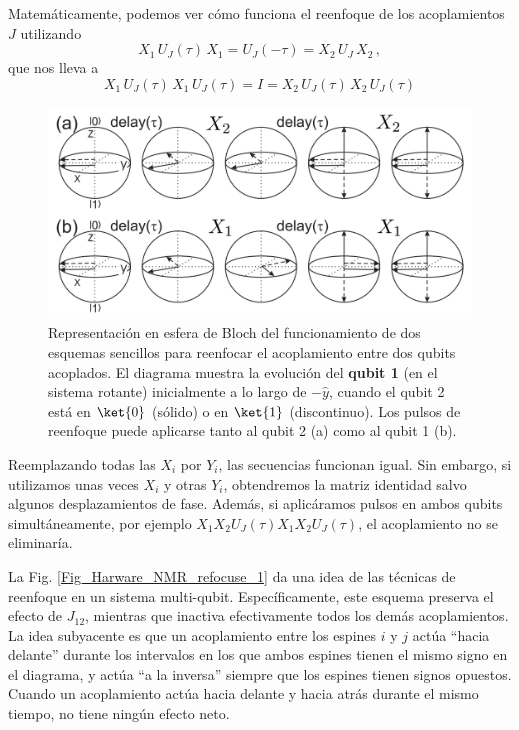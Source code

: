 Matemáticamente, podemos ver cómo funciona el reenfoque de los acoplamientos $J$ utilizando 
	\begin{equation}
	X_1 \, U_J(\tau) \, X_1 = U_J (- \tau) = X_2 \, U_J \, X_2 \, ,
	\end{equation}
que nos lleva a 
	\begin{equation}
	 X_1 \, U_J(\tau) \, X_1 \, U_J(\tau) = I =  X_2 \, U_J(\tau) \, X_2 \, U_J(\tau)
	\end{equation}




	\begin{figure}[t]
	\centering 
	\includegraphics[width=0.7\linewidth]{Figuras/Fig_Harware_NMR_refocusing.png}
	\caption{Representación en esfera de Bloch del funcionamiento de dos esquemas sencillos para reenfocar el acoplamiento entre dos qubits acoplados. El diagrama muestra la evolución del \textbf{qubit 1} (en el sistema rotante) inicialmente a lo largo de $- \hat{y}$, cuando el qubit 2 está en $\ket{0}$ (sólido) o en $\ket{1}$ (discontinuo). Los pulsos de reenfoque puede aplicarse tanto al  qubit 2 (a) como al qubit 1 (b).}
	\label{Fig_Harware_NMR_refocusing}
	\end{figure}


Reemplazando todas las $X_i$ por $Y_i$, las secuencias funcionan igual. Sin embargo, si utilizamos unas veces $X_i$ y otras $Y_i$, obtendremos la matriz identidad salvo algunos desplazamientos de fase. Además, si aplicáramos pulsos en ambos qubits simultáneamente, por ejemplo $X_1X_2 U_J(\tau)X_1 X_2 U_J(\tau)$, el acoplamiento no se eliminaría. 

La Fig. \ref{Fig_Harware_NMR_refocuse_1} da una idea de las técnicas de reenfoque en un sistema multi-qubit. Específicamente, este esquema preserva el efecto de $J_{12}$, mientras que inactiva efectivamente todos los demás acoplamientos. La idea subyacente es que un acoplamiento entre los espines $i$ y $j$ actúa ``hacia delante'' durante los intervalos en los que ambos espines tienen el mismo signo en el diagrama, y actúa ``a la inversa'' siempre que los espines tienen signos opuestos. Cuando un acoplamiento actúa hacia delante y hacia atrás durante el mismo tiempo, no tiene ningún efecto neto.


